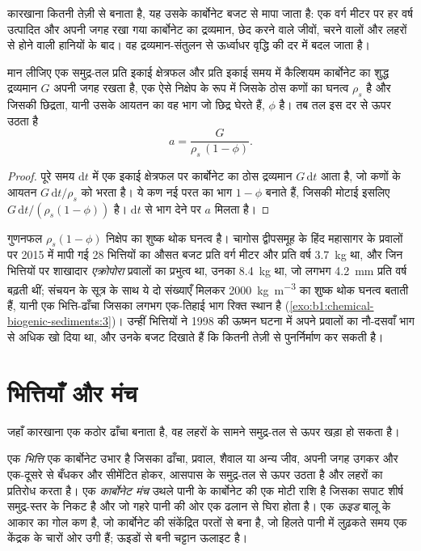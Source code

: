 कारखाना कितनी तेज़ी से बनाता है, यह उसके कार्बोनेट बजट से मापा जाता है: एक वर्ग मीटर पर हर वर्ष उत्पादित और अपनी जगह रखा गया कार्बोनेट का द्रव्यमान, छेद करने वाले जीवों, चरने वालों और लहरों से होने वाली हानियों के बाद। वह द्रव्यमान-संतुलन से ऊर्ध्वाधर वृद्धि की दर में बदल जाता है।

\begin{proposition}\label{prop:b1:chemical-biogenic-sediments:accretion}
मान लीजिए एक समुद्र-तल प्रति इकाई क्षेत्रफल और प्रति इकाई समय में कैल्शियम कार्बोनेट का शुद्ध द्रव्यमान $G$ अपनी जगह रखता है, एक ऐसे निक्षेप के रूप में जिसके ठोस कणों का घनत्व $\rho_s$ है और जिसकी छिद्रता, यानी उसके आयतन का वह भाग जो छिद्र घेरते हैं, $\phi$ है। तब तल इस दर से ऊपर उठता है
\[
a = \frac{G}{\rho_s\,(1-\phi)}.
\]
\end{proposition}

\begin{proof}
पूरे समय $\mathrm dt$ में एक इकाई क्षेत्रफल पर कार्बोनेट का ठोस द्रव्यमान $G\,\mathrm dt$ आता है, जो कणों के आयतन $G\,\mathrm dt/\rho_s$ को भरता है। ये कण नई परत का भाग $1-\phi$ बनाते हैं, जिसकी मोटाई इसलिए $G\,\mathrm dt/(\rho_s(1-\phi))$ है। $\mathrm dt$ से भाग देने पर $a$ मिलता है।
\end{proof}

गुणनफल $\rho_s(1-\phi)$ निक्षेप का शुष्क थोक घनत्व है। चागोस द्वीपसमूह के हिंद महासागर के प्रवालों पर 2015 में मापी गई 28 भित्तियों का औसत बजट प्रति वर्ग मीटर और प्रति वर्ष \qty{3.7}{kg}  था, और जिन भित्तियों पर शाखादार \emph{एक्रोपोरा} प्रवालों का प्रभुत्व था, उनका \qty{8.4}{kg} था, जो लगभग \qty{4.2}{mm} प्रति वर्ष बढ़ती थीं; संचयन के सूत्र के साथ ये दो संख्याएँ मिलकर \qty{2000}{kg.m^{-3}} का शुष्क थोक घनत्व बताती हैं, यानी एक भित्ति-ढाँचा जिसका लगभग एक-तिहाई भाग रिक्त स्थान है (\cref{exo:b1:chemical-biogenic-sediments:3})। उन्हीं भित्तियों ने 1998 की ऊष्मन घटना में अपने प्रवालों का नौ-दसवाँ भाग से अधिक खो दिया था, और उनके बजट दिखाते हैं कि  कितनी तेज़ी से पुनर्निर्माण कर सकती है।

\section{भित्तियाँ और मंच}\label{sec:b1:chemical-biogenic-sediments:reefs}

जहाँ कारखाना एक कठोर ढाँचा बनाता है, वह लहरों के सामने समुद्र-तल से ऊपर खड़ा हो सकता है।

\begin{definition}[भित्ति, कार्बोनेट मंच, ऊइड]\label{def:b1:chemical-biogenic-sediments:reef}
एक \emph{भित्ति} एक कार्बोनेट उभार है जिसका ढाँचा, प्रवाल, शैवाल या अन्य जीव, अपनी जगह उगकर और एक-दूसरे से बँधकर और सीमेंटित होकर, आसपास के समुद्र-तल से ऊपर उठता है और लहरों का प्रतिरोध करता है। एक \emph{कार्बोनेट मंच} उथले पानी के कार्बोनेट की एक मोटी राशि है जिसका सपाट शीर्ष समुद्र-स्तर के निकट है और जो गहरे पानी की ओर एक ढलान से घिरा होता है। एक \emph{ऊइड} बालू के आकार का गोल कण है, जो कार्बोनेट की संकेंद्रित परतों से बना है, जो हिलते पानी में लुढ़कते समय एक केंद्रक के चारों ओर उगी हैं; ऊइडों से बनी चट्टान ऊलाइट है।
\end{definition}

